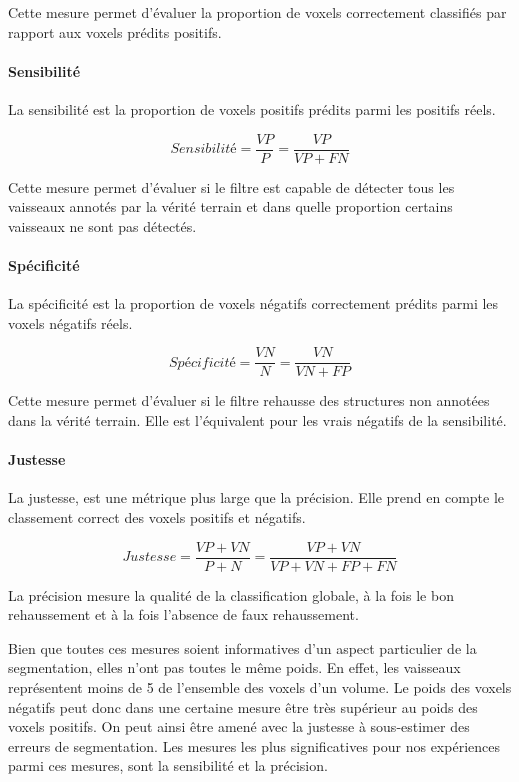 Cette mesure permet d'évaluer la proportion de voxels correctement classifiés par rapport aux voxels prédits positifs.

\paragraph{Sensibilité}

La sensibilité est la proportion de voxels positifs prédits parmi les positifs réels.

\begin{equation}
  Sensibilité = \frac{VP}{P} = \frac{VP}{VP+FN}
\end{equation}

Cette mesure permet d'évaluer si le filtre est capable de détecter tous les vaisseaux annotés par la vérité terrain et dans quelle proportion certains vaisseaux ne sont pas détectés. 

\paragraph{Spécificité}

La spécificité est la proportion de voxels négatifs correctement prédits parmi les voxels négatifs réels.

\begin{equation}
  Spécificité = \frac{VN}{N} = \frac{VN}{VN+FP}
\end{equation}

Cette mesure permet d'évaluer si le filtre rehausse des structures non annotées dans la vérité terrain. Elle est l'équivalent pour les vrais négatifs de la sensibilité.

\paragraph{Justesse}

La justesse, est une métrique plus large que la précision. Elle prend en compte le classement correct des voxels positifs et négatifs. 

\begin{equation}
  Justesse = \frac{VP+VN}{P+N} = \frac{VP+VN}{VP+VN+FP+FN}
\end{equation}

La précision mesure la qualité de la classification globale, à la fois le bon rehaussement et à la fois l'absence de faux rehaussement.

Bien que toutes ces mesures soient informatives d'un aspect particulier de la segmentation, elles n'ont pas toutes le même poids. En effet, les vaisseaux représentent moins de 5 \percent{}de l'ensemble des voxels d'un volume. Le poids des voxels négatifs peut donc dans une certaine mesure être très supérieur au poids des voxels positifs. On peut ainsi être amené avec la justesse à sous-estimer des erreurs de segmentation. Les mesures les plus significatives pour nos expériences parmi ces mesures, sont la sensibilité et la précision.


